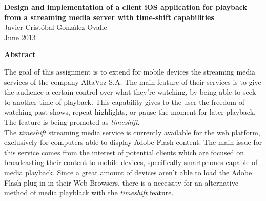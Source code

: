 \newpage
\thispagestyle{empty}
\begin{center}
 \Large \textbf{Design and implementation of a client iOS application for playback from a streaming media server with time-shift capabilities}\\
  

\normalsize Javier Cristóbal González Ovalle \\
\normalsize June 2013

\Large \textbf{Abstract}

\end{center}
\normalsize

The goal of this assignment is to extend for mobile devices the streaming media services of the company AltaVoz S.A. The main feature of their services is to give the audience a certain control over what they're watching, by being able to seek to another time of playback. This capability gives to the user the freedom of watching past shows, repeat highlights, or pause the moment for later playback. The feature is being promoted as \textit{timeshift}.\\



The \textit{timeshift} streaming media service is currently available for the web platform, exclusively for computers able to display Adobe Flash content. The main issue for this service comes from the interest of potential clients which are focused on broadcasting their content to mobile devices, specifically smartphones capable of media playback. Since a great amount of devices aren't able to load the Adobe Flash plug-in in their Web Browsers, there is a necessity for an alternative method of media playblack with the \textit{timeshift} feature.\\


